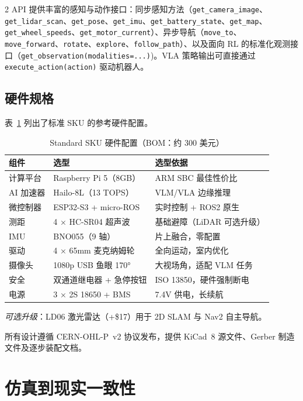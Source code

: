 \documentclass[UTF8]{ctexart}
\begin{document}
\begin{multicols}{2}
API 提供丰富的感知与动作接口：同步感知方法（\texttt{get\_camera\_image}、\texttt{get\_lidar\_scan}、\texttt{get\_pose}、\texttt{get\_imu}、\texttt{get\_battery\_state}、\texttt{get\_map}、\texttt{get\_wheel\_speeds}、\texttt{get\_motor\_current}）、异步导航（\texttt{move\_to}、\texttt{move\_forward}、\texttt{rotate}、\texttt{explore}、\texttt{follow\_path}）、以及面向 RL 的标准化观测接口（\texttt{get\_observation(modalities=...)})。VLA 策略输出可直接通过 \texttt{execute\_action(action)} 驱动机器人。

\subsection{硬件规格}

表~\ref{tab:hardware} 列出了标准 SKU 的参考硬件配置。

\begin{table}[H]
\centering
\caption{Standard SKU 硬件配置（BOM：约 300 美元）}
\label{tab:hardware}
\scriptsize
\begin{tabular}{@{}lll@{}}
\toprule
组件 & 选型 & 选型依据 \\
\midrule
计算平台 & Raspberry Pi 5（8GB） & ARM SBC 最佳性价比 \\
AI 加速器 & Hailo-8L（13 TOPS） & VLM/VLA 边缘推理 \\
微控制器 & ESP32-S3 + micro-ROS & 实时控制 + ROS2 原生 \\
测距 & 4 × HC-SR04 超声波 & 基础避障（LiDAR 可选升级） \\
IMU & BNO055（9 轴） & 片上融合，零配置 \\
驱动 & 4 × 65mm 麦克纳姆轮 & 全向运动，室内优化 \\
摄像头 & 1080p USB 鱼眼 170° & 大视场角，适配 VLM 任务 \\
安全 & 双通道继电器 + 急停按钮 & ISO 13850，硬件强制断电 \\
电源 & 3 × 2S 18650 + BMS & 7.4V 供电，长续航 \\
\bottomrule
\end{tabular}
\end{table}

\noindent \textit{可选升级}：LD06 激光雷达（+\$17）用于 2D SLAM 与 Nav2 自主导航。

所有设计遵循 CERN-OHL-P~v2 协议发布，提供 KiCad~8 源文件、Gerber 制造文件及逐步装配文档。

\section{仿真到现实一致性}


\end{multicols}
\end{document}

